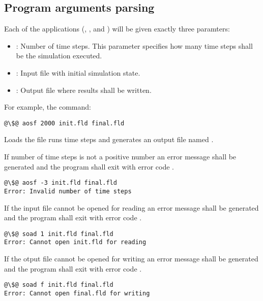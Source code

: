 \subsection{Program arguments parsing}

Each of the applications (, ,  and
) will be given exactly three paramters:

\begin{itemize}
\item {}: Number of time steps. This parameter specifies how many
time steps shall be the simulation executed.
\item {}: Input file with initial simulation state.
\item {}: Output file where results shall be written.
\end{itemize}

For example, the command:

\begin{lstlisting}[style=terminal,escapechar=@]
@\$@ aosf 2000 init.fld final.fld
\end{lstlisting}

Loads the file  runs  time steps and generates an
output file named .

If number of time steps is not a positive number an error message shall be
generated and the program shall exit with error code .

\begin{lstlisting}[style=terminal,escapechar=@]
@\$@ aosf -3 init.fld final.fld
Error: Invalid number of time steps
\end{lstlisting}

If the input file cannot be opened for reading an error message shall be
generated and the program shall exit with error code .

\begin{lstlisting}[style=terminal,escapechar=@]
@\$@ soad 1 init.fld final.fld
Error: Cannot open init.fld for reading
\end{lstlisting}

If the otput file cannot be opened for writing an error message shall be
generated and the program shall exit with error code .

\begin{lstlisting}[style=terminal,escapechar=@]
@\$@ soad f init.fld final.fld
Error: Cannot open final.fld for writing
\end{lstlisting}
